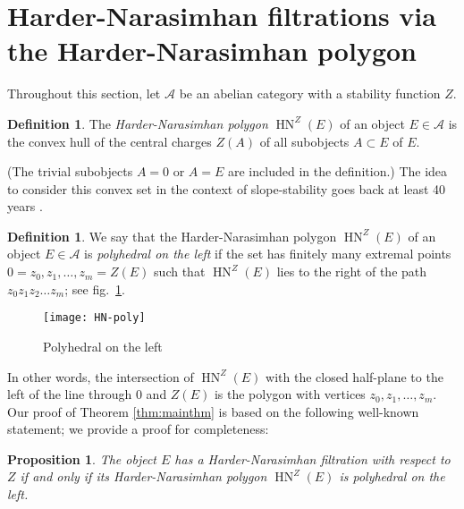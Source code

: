 \documentclass[leqno,11pt,twoside]{amsart}
\newtheorem{Prop}[Thm]{Proposition}
\theoremstyle{definition}
\newtheorem{Def}[Thm]{Definition}
\begin{document}
\section{Harder-Narasimhan filtrations via the Harder-Narasimhan polygon}\label{sect:HNpolygon}

Throughout this section, let ${\ensuremath{\mathcal A}}$ be an abelian category with a stability function $Z$.

\begin{Def}
The \emph{Harder-Narasimhan polygon} ${\mathop{\mathrm{HN}}\nolimits}^Z(E)$ of an object $E \in {\ensuremath{\mathcal A}}$ is the convex
hull of the central charges $Z(A)$ of all subobjects $A \subset E$ of $E$.
\end{Def}
(The trivial subobjects $A = 0$ or $A = E$ are included in the definition.) The idea to consider
this convex set in the context of slope-stability goes back at least 40 years
\cite{Shatz:Degeneration}.

\begin{Def} We say that the Harder-Narasimhan polygon ${\mathop{\mathrm{HN}}\nolimits}^Z(E)$ of an object $E \in {\ensuremath{\mathcal A}}$
is \emph{polyhedral on the left} if the set has finitely many extremal points
$0 = z_0, z_1, \dots, z_m = Z(E)$ such that ${\mathop{\mathrm{HN}}\nolimits}^Z(E)$ lies to the right of the 
path $z_0z_1z_2\dots z_m$;
see fig.~\ref{fig:HNpoly}.
\end{Def}

\begin{figure}[htb]
  \begin{center}
        \texttt{[image: HN-poly]}
    \caption{Polyhedral on the left}
    \label{fig:HNpoly}
  \end{center}
\end{figure}

In other words, the intersection of ${\mathop{\mathrm{HN}}\nolimits}^Z(E)$ with the closed half-plane to the
left of the line through $0$ and $Z(E)$ is the polygon with vertices $z_0, z_1, \dots, z_m$.
Our proof of Theorem \ref{thm:mainthm} is based on the following well-known statement; we provide a
proof for completeness:

\begin{Prop} \label{prop:HNviapoly}
The object $E$ has a Harder-Narasimhan filtration with respect to $Z$ if and only if its
Harder-Narasimhan polygon ${\mathop{\mathrm{HN}}\nolimits}^Z(E)$ is polyhedral on the left.
\end{Prop}
\end{document}
